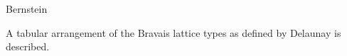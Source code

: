 \documentclass[preprint]{iucr}              %
\numberwithin{equation}{section}
\begin{document}
	
	\author[b]{Herbert J.}{Bernstein}
	
	
	
	
	
	
	
	
	
	
	\maketitle                        %
	
	\begin{synopsis}
		
		A tabular arrangement of the Bravais lattice types as
		defined by Delaunay is described.

	\end{synopsis}
	\newcommand{\si}[0]{$s_1$}
	\newcommand{\sii}[0]{$s_2$}
	\newcommand{\siii}[0]{$s_3$}
	\newcommand{\siv}[0]{$s_4$}
	\newcommand{\sv}[0]{$s_5$}
	\newcommand{\svi}[0]{$s_6$}
	\newcommand{\Svec} [0] {\{\si, \sii, \siii, \siv, \sv, \svi \}}
	\newcommand{\SvecA} [0] {\{-\si, -\si+\sii, \si+\siii, \si+\sv, \si+\siv, \si+\svi \}}
	
	\newcommand{\OPES}[0]{$E^3toS^6$}
	\newcommand{\OPESS}[0]{$$E^3toS^6$$}
	\newcommand{\MSVI}[0]{$M_{S^{6}}$}
	\newcommand{\MEIII}[0]{$M_{E^{3}}$}
	\newcommand{\Plus}[0]{\mathcal{P}}	
	\newcommand{\Minus}[0]{\mathcal{M}}
	
\end{document}
